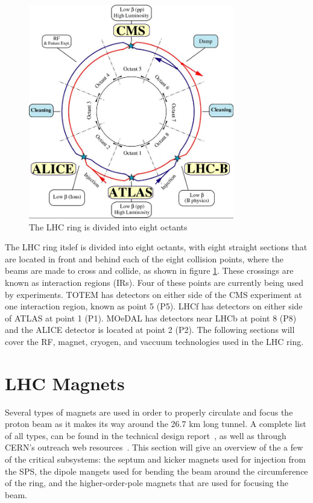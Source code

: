 \begin{figure}[h]
   \centering
  \includegraphics[width=0.8\textwidth]{Figures/LHC_Diagrams/LHC_Octant.jpg}
  \caption{The LHC ring is divided into eight octants} \label{fig:lhc_octants}
\end{figure}

\par The LHC ring itslef is divided into eight octants, with eight
straight sections that are located in front and behind each of the
eight collision points, where the beams are made to cross and
collide, as shown in figure \ref{fig:lhc_octants}.  These crossings
are known as interaction regions (IRs).  Four of these points are
currently being used by experiments.  TOTEM has detectors on either
side of the CMS experiment at one interaction region, known as point 5
(P5).  LHCf has detectors on either side of ATLAS at point 1 (P1).
MOeDAL has detectors near LHCb at point 8 (P8) and the ALICE detector
is located at point 2 (P2).  The following sections will cover the RF,
magnet, cryogen, and vaccuum technologies used in the LHC ring.  


\section{LHC Magnets}
\label{lhc_magnets}

\par Several types of magnets are used in order to properly circulate
and focus the proton beam as it makes its way around the 26.7 km long
tunnel.  A complete list of all types, can be found in the technical
design report~\cite{LHC:TDR_Vol1_MainRing_Brüning}, as well as through
CERN's outreach web
resources~\cite{LHC:LHC_outreach_listOfAllMagnets}.  This section will
give an overview of the a few of the critical subsystems: the septum
and kicker magnets used for injection from the SPS, the dipole mangets
used for bending the beam around the circumference of the ring, and
the higher-order-pole magnets that are used for focusing the beam.  

